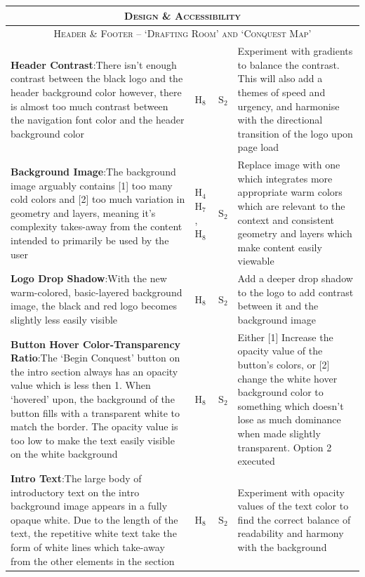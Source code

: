 \documentclass[11pt, english]{article}
\begin{document}
\begin{center}
\begin{longtable}{p{7.5cm}p{0.5cm}p{0.5cm}p{4cm}}
		\hline
		\hline
		\multicolumn{4}{c}{\textsc{Design \& Accessibility}}\\
		\hline
		\hline
		\multicolumn{4}{c}{\textsc{Header \& Footer -- `Drafting Room' and `Conquest Map'}}\\
		\hline
		\textbf{Header Contrast}:\newline There isn't enough contrast between the black logo and the header background color however, there is almost too much contrast between the navigation font color and the header background color & $\mathrm{H_{8}}$ & $\mathrm{S_{2}}$ & Experiment with gradients to balance the contrast. This will also add a themes of speed and urgency, and harmonise with the directional transition of the logo upon page load\\
		\textbf{Background Image}:\newline The background image arguably contains [1] too many cold colors and [2] too much variation in geometry and layers, meaning it's complexity takes-away from the content intended to primarily be used by the user & $\mathrm{H_{4}}$ $\mathrm{H_{7}}$, $\mathrm{H_{8}}$ & $\mathrm{S_{2}}$ & Replace image with one which integrates more appropriate warm colors which are relevant to the context and consistent geometry and layers which make content easily viewable\\
		\textbf{Logo Drop Shadow}:\newline With the new warm-colored, basic-layered background image, the black and red logo becomes slightly less easily visible & $\mathrm{H_{8}}$ & $\mathrm{S_{2}}$ & Add a deeper drop shadow to the logo to add contrast between it and the background image\\
		\textbf{Button Hover Color-Transparency Ratio}:\newline The `Begin Conquest' button on the intro section always has an opacity value which is less then 1. When `hovered' upon, the background of the button fills with a transparent white to match the border. The opacity value is too low to make the text easily visible on the white background & $\mathrm{H_{8}}$ & $\mathrm{S_{2}}$ & Either [1] Increase the opacity value of the button's colors, or [2] change the white hover background color to something which doesn't lose as much dominance when made slightly transparent. Option 2 executed\\
		\textbf{Intro Text}:\newline The large body of introductory text on the intro background image appears in a fully opaque white. Due to the length of the text, the repetitive white text take the form of white lines which take-away from the other elements in the section & $\mathrm{H_{8}}$ & $\mathrm{S_{2}}$ & Experiment with opacity values of the text color to find the correct balance of readability and harmony with the background\\

\end{longtable}
\end{center}
\end{document}
